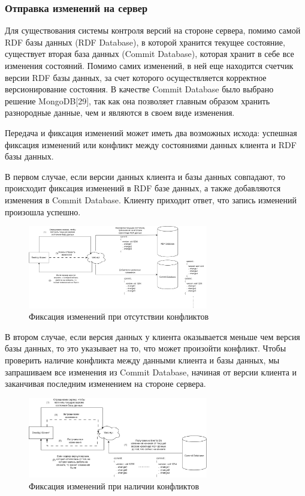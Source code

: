 \documentclass[12pt]{article}
\begin{document}
\subsubsection{Отправка изменений на сервер}
\qquad Для существования системы контроля версий на стороне сервера, помимо самой RDF базы данных (RDF Database), в которой хранится текущее состояние, существует вторая база данных (Commit Database), которая хранит в себе все изменения состояний. Помимо самих изменений, в ней еще находится счетчик версии RDF базы данных, за счет которого осуществляется корректное версионирование состояния. В качестве Commit Database было выбрано решение MongoDB[29], так как она позволяет главным образом хранить разнородные данные, чем и являются в своем виде изменения.

Передача и фиксация изменений может иметь два возможных исхода: успешная фиксация изменений или конфликт между состояниями данных клиента и RDF базы данных.

В первом случае, если версии данных клиента и базы данных совпадают, то происходит фиксация изменений в RDF базе данных, а также добавляются изменения в Commit Database. Клиенту приходит ответ, что запись изменений произошла успешно.

\begin{figure}[!ht]
    \centering
    \includegraphics[width=0.7\textwidth]{_images/if_merge_success.png}
    \caption{Фиксация изменений при отсутствии конфликтов}
    \label{fig:if_merge_success}
\end{figure}

В втором случае, если версия данных у клиента оказывается меньше чем версия базы данных, то это указывает на то, что может произойти конфликт. Чтобы проверить наличие конфликта между данными клиента и базы данных, мы запрашиваем все изменения из Commit Database, начиная от версии клиента и заканчивая последним изменением на стороне сервера.

\begin{figure}[!ht]
    \centering
    \includegraphics[width=0.7\textwidth]{_images/if_merge_failure.png}
    \caption{Фиксация изменений при наличии конфликтов}
    \label{fig:if_merge_failure}
\end{figure}
\end{document}
